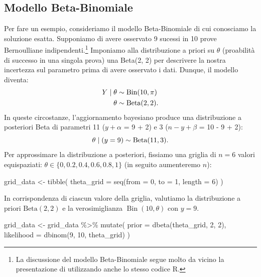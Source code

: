\documentclass[
  10pt,
  italian,
  a4paper,
  extrafontsizes,onecolumn,openright
  ]{memoir}
\newenvironment{Shaded}{\begin{snugshade}}{\end{snugshade}}
\newcommand{\AttributeTok}[1]{\textcolor[rgb]{0.77,0.63,0.00}{#1}}
\newcommand{\DecValTok}[1]{\textcolor[rgb]{0.00,0.00,0.81}{#1}}
\newcommand{\FunctionTok}[1]{\textcolor[rgb]{0.00,0.00,0.00}{#1}}
\newcommand{\NormalTok}[1]{#1}
\newcommand{\OtherTok}[1]{\textcolor[rgb]{0.56,0.35,0.01}{#1}}
\newcommand{\SpecialCharTok}[1]{\textcolor[rgb]{0.00,0.00,0.00}{#1}}
\DeclareMathOperator{\Bin}{Bin} %
\newcommand{\R}{\textsf{R}} %
\begin{document}
\hypertarget{modello-beta-binomiale}{%
\subsection{Modello Beta-Binomiale}\label{modello-beta-binomiale}}

Per fare un esempio, consideriamo il modello Beta-Binomiale di cui conosciamo la soluzione esatta. Supponiamo di avere osservato 9 sucessi in 10 prove Bernoulliane indipendenti.\footnote{La discussione del modello Beta-Binomiale segue molto da vicino la presentazione di \textcite{Johnson2022bayesrules} utilizzando anche lo stesso codice \R.} Imponiamo alla distribuzione a priori su \(\theta\) (proabilità di successo in una singola prova) una Beta(2, 2) per descrivere la nostra incertezza sul parametro prima di avere osservato i dati. Dunque, il modello diventa:
\begin{align}
Y \mid \theta & \sim \text{Bin}(10, \pi) \notag\\
\theta & \sim \mbox{Beta}(2, 2).\notag
\end{align}
In queste circostanze, l'aggiornamento bayesiano produce una distribuzione a posteriori Beta di parametri 11 (\(y + \alpha\) = 9 + 2) e 3 (\(n - y + \beta\) = 10 - 9 + 2):
\begin{equation}
\theta \mid (y = 9) \sim \mbox{Beta}(11, 3).\notag
\end{equation}
Per approssimare la distribuzione a posteriori, fissiamo una griglia di \(n = 6\) valori equispaziati: \(\theta \in \{0, 0.2, 0.4, 0.6, 0.8, 1\}\) (in seguito aumenteremo \(n\)):

\begin{Shaded}
\begin{Highlighting}[]
\NormalTok{grid\_data }\OtherTok{\textless{}{-}} \FunctionTok{tibble}\NormalTok{(}
  \AttributeTok{theta\_grid =} \FunctionTok{seq}\NormalTok{(}\AttributeTok{from =} \DecValTok{0}\NormalTok{, }\AttributeTok{to =} \DecValTok{1}\NormalTok{, }\AttributeTok{length =} \DecValTok{6}\NormalTok{)}
\NormalTok{)}
\end{Highlighting}
\end{Shaded}

\noindent
In corrispondenza di ciascun valore della griglia, valutiamo la distribuzione a priori \(\mbox{Beta}(2, 2)\) e la verosimiglianza \(\Bin(10, \theta)\) con \(y = 9\).

\begin{Shaded}
\begin{Highlighting}[]
\NormalTok{grid\_data }\OtherTok{\textless{}{-}}\NormalTok{ grid\_data }\SpecialCharTok{\%\textgreater{}\%}
  \FunctionTok{mutate}\NormalTok{(}
    \AttributeTok{prior =} \FunctionTok{dbeta}\NormalTok{(theta\_grid, }\DecValTok{2}\NormalTok{, }\DecValTok{2}\NormalTok{),}
    \AttributeTok{likelihood =} \FunctionTok{dbinom}\NormalTok{(}\DecValTok{9}\NormalTok{, }\DecValTok{10}\NormalTok{, theta\_grid)}
\NormalTok{  )}
\end{Highlighting}
\end{Shaded}
\end{document}
